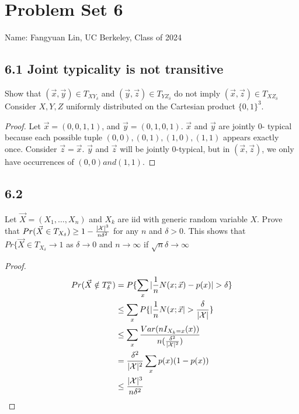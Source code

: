 \documentclass[../main.tex]{subfiles}
\begin{document}
\section*{Problem Set 6}
    Name: Fangyuan Lin, UC Berkeley, Class of 2024

\subsection*{6.1 Joint typicality is not transitive}
Show that $(\vec x,\vec y)\in T_{XY_\delta}$ and $(\vec y, \vec z)\in T_{YZ_\delta}$ do not imply $(\vec x, \vec z)\in T_{XZ_\delta}$
Consider $X,Y,Z$ uniformly distributed on the Cartesian product $\{0,1\}^3$.
\begin{proof}
Let $\vec x=(0,0,1,1)$, and $\vec y=(0,1,0,1)$. $\vec x$ and $\vec y$ are jointly $0$- typical because each possible tuple $(0,0), (0,1), (1,0), (1,1)$ appears exactly once. Consider $\vec z = \vec x$. $\vec y$ and $\vec z$ will be jointly $0$-typical, but in $(\vec x, \vec z)$, we only have occurrences of $(0,0) and (1,1)$.
\end{proof}


\subsection*{6.2}
Let $\vec X = (X_1,\dots,X_n)$ and $X_k$ are iid with generic random variable $X$. Prove that $Pr(\vec X\in T_{X_\delta})\geq 1-\frac{|\mathcal{X}|^3}{n\delta^2}$ for any $n$ and $\delta >0$. 
\newline 
This shows that $Pr\{\vec X\in T_{X_\delta}\to 1$ as $\delta\to 0$ and $n\to \infty$ if $\sqrt{n}\delta\to \infty$
\begin{proof}
    \begin{align*}
        Pr(\vec X\notin T^n_\delta) &= P\{\sum_x|\frac{1}{n}N(x;\vec x)-p(x)|>\delta\}\\
        &\leq \sum_x P\{|\frac{1}{n}N(x;\vec x| > \frac{\delta
        }{|\X|}\}\\
        &\leq \sum_x\frac{Var(nI_{X_k=x}(x))}{n(\frac{\delta^2}{|\X|^2})}\\
        &=\frac{\delta^2}{|\X|^2} \sum_xp(x)(1-p(x))\\
        &\leq\frac{|\X|^3}{n\delta^2}
    \end{align*}
\end{proof}
\end{document}
